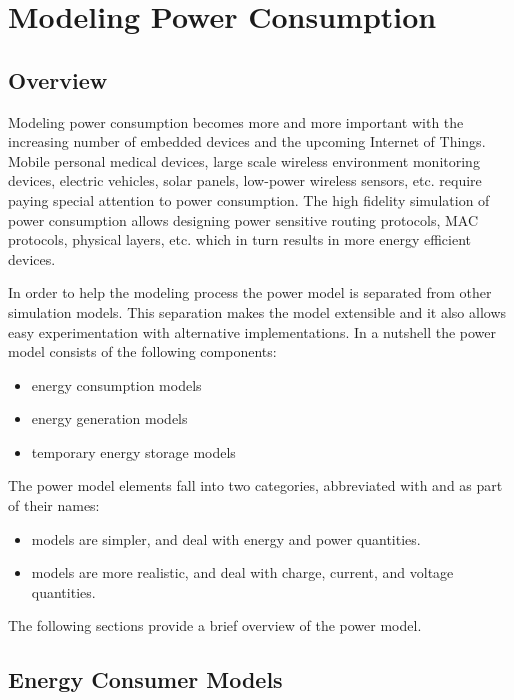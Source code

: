 \chapter{Modeling Power Consumption}
\label{cha:power}

\section{Overview}
\label{sec:power:overview}

Modeling power consumption becomes more and more important with the increasing
number of embedded devices and the upcoming Internet of Things. Mobile personal
medical devices, large scale wireless environment monitoring devices, electric
vehicles, solar panels, low-power wireless sensors, etc. require paying special
attention to power consumption. The high fidelity simulation of power
consumption allows designing power sensitive routing protocols, MAC protocols,
physical layers, etc. which in turn results in more energy efficient devices.

In order to help the modeling process the power model is separated from other
simulation models. This separation makes the model extensible and it also allows
easy experimentation with alternative implementations. In a nutshell the power
model consists of the following components:

\begin{itemize}
  \item energy consumption models
  \item energy generation models
  \item temporary energy storage models
\end{itemize}

The power model elements fall into two categories, abbreviated with 
and  as part of their names:

\begin{itemize}
  \item {} models are simpler, and deal with energy and power quantities.
  \item {} models are more realistic, and deal with charge, current, and voltage quantities.
\end{itemize}

The following sections provide a brief overview of the power model.

\section{Energy Consumer Models}
\label{sec:power:energy-consumer-models}

